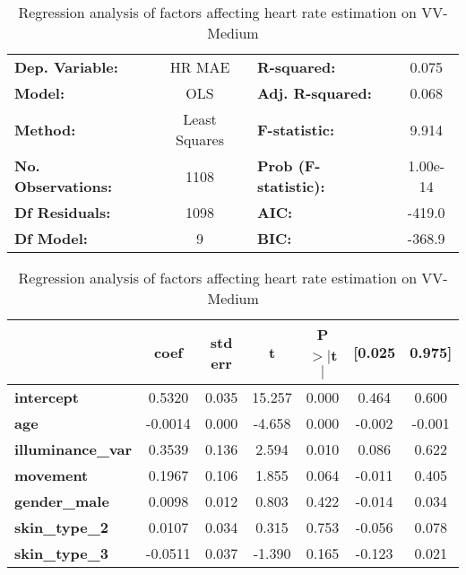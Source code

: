 \documentclass{article}
\begin{document}
\begin{table}[h!]
\begin{center}
\caption{Regression analysis of factors affecting heart rate estimation on VV-Medium}
\label{tab:vv-hr-regression-vv}
\begin{tabular}{lclc}
\toprule
\textbf{Dep. Variable:}          &  HR MAE          & \textbf{  R-squared:         } &     0.075   \\
\textbf{Model:}                  &       OLS        & \textbf{  Adj. R-squared:    } &     0.068   \\
\textbf{Method:}                 &  Least Squares   & \textbf{  F-statistic:       } &     9.914   \\
\textbf{No. Observations:}       &        1108      & \textbf{  Prob (F-statistic):} &  1.00e-14   \\
\textbf{Df Residuals:}           &        1098      & \textbf{  AIC:               } &    -419.0   \\
\textbf{Df Model:}               &           9      & \textbf{  BIC:               } &    -368.9   \\
\bottomrule
\end{tabular}
\begin{tabular}{lcccccc}
                                 & \textbf{coef} & \textbf{std err} & \textbf{t} & \textbf{P$> |$t$|$} & \textbf{[0.025} & \textbf{0.975]}  \\
\midrule
\textbf{intercept}               &       0.5320  &        0.035     &    15.257  &         0.000        &        0.464    &        0.600     \\
\textbf{age}            			 &      -0.0014  &        0.000     &    -4.658  &         0.000        &       -0.002    &       -0.001     \\
\textbf{illuminance\_var} 		 &       0.3539  &        0.136     &     2.594  &         0.010        &        0.086    &        0.622     \\
\textbf{movement}       			 &       0.1967  &        0.106     &     1.855  &         0.064        &       -0.011    &        0.405     \\
\textbf{gender\_male}   			 &       0.0098  &        0.012     &     0.803  &         0.422        &       -0.014    &        0.034     \\
\textbf{skin\_type\_2}  			 &       0.0107  &        0.034     &     0.315  &         0.753        &       -0.056    &        0.078     \\
\textbf{skin\_type\_3}  			 &      -0.0511  &        0.037     &    -1.390  &         0.165        &       -0.123    &        0.021     \\

\end{tabular}
\end{center}
\end{table}
\end{document}
